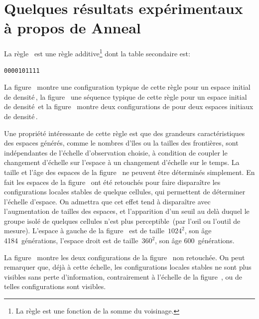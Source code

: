 \section[r\'esultat exp\'erimentaux]%
{Quelques r\'esultats exp\'erimentaux \`a propos de Anneal}

La r\`egle~ est une r\`egle additive\footnote{%
  La r\`egle est une fonction de la somme du voisinage. %
  } %
dont la table secondaire est:
\begin{verbatim}
0000101111
\end{verbatim}
La figure~ montre une configuration typique
de cette r\`egle pour un espace initial de densit\'e\,\undemi, %
la figure~ une s\'equence typique de
cette r\`egle pour un espace initial de densit\'e\,\undemi %
et la figure~ montre deux configurations de
 pour deux espaces initiaux de densit\'e\,\undemi. %

Une propri\'et\'e int\'eressante de cette r\`egle est que des grandeurs
caract\'eristiques des espaces g\'en\'er\'es, comme le nombres d'\^iles ou la
tailles des fronti\`eres, sont ind\'ependantes de l'\'echelle d'observation
choisie, \`a condition de coupler le changement d'\'echelle sur l'espace
\`a un changement d'\'echelle sur le temps. %
La taille et l'\^age des espaces de la figure~
ne peuvent \^etre d\'etermin\'es simplement. %
En fait les espaces de la figure~ ont \'et\'e
retouch\'es pour faire dispara\^itre les configurations locales stables de
quelque cellules, qui permettent de d\'eterminer l'\'echelle d'espace. %
On admettra que cet effet tend \`a dispara\^itre avec l'augmentation de
tailles des espaces, et l'apparition d'un seuil au del\`a duquel le
groupe isol\'e de quelques cellules n'est plus perceptible~(par l'{\oe}il
ou l'outil de mesure). %
L'espace \`a gauche de la figure~ est de
taille~$1024^2$, son \^age 4184~g\'en\'erations, %
l'espace droit est de taille~$360^2$, son \^age 600~g\'en\'erations.

\noindent%
La figure~ montre les deux configurations de
la figure~ non retouch\'ee. %
On peut remarquer que, d\'ej\`a \`a cette \'echelle, les configurations
locales stables ne sont plus visibles sans perte d'information,
contrairement \`a l'\'echelle de la figure~, ou de
telles configurations sont visibles. %

